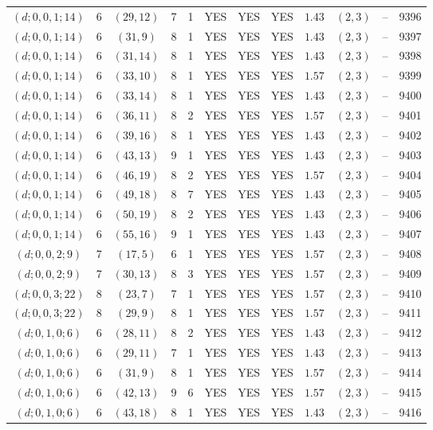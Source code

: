 \begin{longtable}{|c|c|c|c|c|c|c|c|c|c|c|c|}
$(d;0,0,1;14)$ & 6 & $(29,12)$ & 7 & 1 & YES & YES & YES & $1.43$ & $(2,3)$ & -- & 9396\\
$(d;0,0,1;14)$ & 6 & $(31,9)$ & 8 & 1 & YES & YES & YES & $1.43$ & $(2,3)$ & -- & 9397\\
$(d;0,0,1;14)$ & 6 & $(31,14)$ & 8 & 1 & YES & YES & YES & $1.43$ & $(2,3)$ & -- & 9398\\
$(d;0,0,1;14)$ & 6 & $(33,10)$ & 8 & 1 & YES & YES & YES & $1.57$ & $(2,3)$ & -- & 9399\\
$(d;0,0,1;14)$ & 6 & $(33,14)$ & 8 & 1 & YES & YES & YES & $1.43$ & $(2,3)$ & -- & 9400\\
$(d;0,0,1;14)$ & 6 & $(36,11)$ & 8 & 2 & YES & YES & YES & $1.57$ & $(2,3)$ & -- & 9401\\
$(d;0,0,1;14)$ & 6 & $(39,16)$ & 8 & 1 & YES & YES & YES & $1.43$ & $(2,3)$ & -- & 9402\\
$(d;0,0,1;14)$ & 6 & $(43,13)$ & 9 & 1 & YES & YES & YES & $1.43$ & $(2,3)$ & -- & 9403\\
$(d;0,0,1;14)$ & 6 & $(46,19)$ & 8 & 2 & YES & YES & YES & $1.57$ & $(2,3)$ & -- & 9404\\
$(d;0,0,1;14)$ & 6 & $(49,18)$ & 8 & 7 & YES & YES & YES & $1.43$ & $(2,3)$ & -- & 9405\\
$(d;0,0,1;14)$ & 6 & $(50,19)$ & 8 & 2 & YES & YES & YES & $1.43$ & $(2,3)$ & -- & 9406\\
$(d;0,0,1;14)$ & 6 & $(55,16)$ & 9 & 1 & YES & YES & YES & $1.43$ & $(2,3)$ & -- & 9407\\
$(d;0,0,2;9)$ & 7 & $(17,5)$ & 6 & 1 & YES & YES & YES & $1.57$ & $(2,3)$ & -- & 9408\\
$(d;0,0,2;9)$ & 7 & $(30,13)$ & 8 & 3 & YES & YES & YES & $1.57$ & $(2,3)$ & -- & 9409\\
$(d;0,0,3;22)$ & 8 & $(23,7)$ & 7 & 1 & YES & YES & YES & $1.57$ & $(2,3)$ & -- & 9410\\
$(d;0,0,3;22)$ & 8 & $(29,9)$ & 8 & 1 & YES & YES & YES & $1.57$ & $(2,3)$ & -- & 9411\\
$(d;0,1,0;6)$ & 6 & $(28,11)$ & 8 & 2 & YES & YES & YES & $1.43$ & $(2,3)$ & -- & 9412\\
$(d;0,1,0;6)$ & 6 & $(29,11)$ & 7 & 1 & YES & YES & YES & $1.43$ & $(2,3)$ & -- & 9413\\
$(d;0,1,0;6)$ & 6 & $(31,9)$ & 8 & 1 & YES & YES & YES & $1.57$ & $(2,3)$ & -- & 9414\\
$(d;0,1,0;6)$ & 6 & $(42,13)$ & 9 & 6 & YES & YES & YES & $1.57$ & $(2,3)$ & -- & 9415\\
$(d;0,1,0;6)$ & 6 & $(43,18)$ & 8 & 1 & YES & YES & YES & $1.43$ & $(2,3)$ & -- & 9416\\

\end{longtable}
